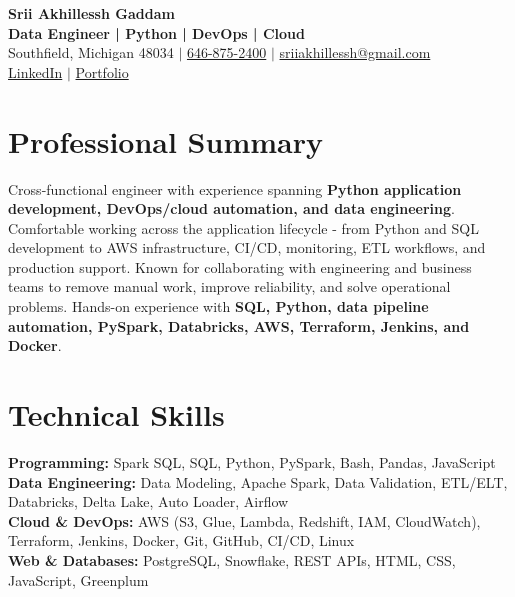 \documentclass[letterpaper,10pt]{article}
\begin{document}
\fontsize{9.35pt}{10.45pt}\selectfont

\begin{center}
    {\LARGE \textbf{Srii Akhillessh Gaddam}} \\[-1pt]
    \textbf{Data Engineer | Python | DevOps | Cloud} \\[2pt]
    Southfield, Michigan 48034 $|$
    \href{tel:6468752400}{646-875-2400} $|$
    \href{mailto:sriiakhillessh@gmail.com}{sriiakhillessh@gmail.com} \\[1pt]
    \href{https://www.linkedin.com/in/srii-akhiilessh-gaddam-b48668191/}{LinkedIn} $|$
    \href{https://sriiakhillesshg.github.io/portfolio/}{Portfolio}
\end{center}
\vspace{-8pt}

\section{Professional Summary}
\small{Cross-functional engineer with experience spanning \textbf{Python application development, DevOps/cloud automation, and data engineering}. Comfortable working across the application lifecycle - from Python and SQL development to AWS infrastructure, CI/CD, monitoring, ETL workflows, and production support. Known for collaborating with engineering and business teams to remove manual work, improve reliability, and solve operational problems. Hands-on experience with \textbf{SQL, Python, data pipeline automation, PySpark, Databricks, AWS, Terraform, Jenkins, and Docker}.}

\section{Technical Skills}
\small{
\textbf{Programming:} Spark SQL, SQL, Python, PySpark, Bash, Pandas, JavaScript \\
\textbf{Data Engineering:} Data Modeling, Apache Spark, Data Validation, ETL/ELT, Databricks, Delta Lake, Auto Loader, Airflow \\
\textbf{Cloud \& DevOps:} AWS (S3, Glue, Lambda, Redshift, IAM, CloudWatch), Terraform, Jenkins, Docker, Git, GitHub, CI/CD, Linux \\
\textbf{Web \& Databases:} PostgreSQL, Snowflake, REST APIs, HTML, CSS, JavaScript, Greenplum
}

\end{document}
